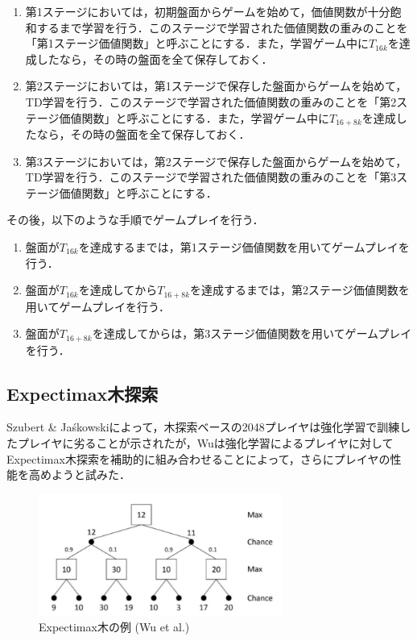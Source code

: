 \documentclass{suribt}
\begin{document}
\begin{enumerate}
\item 第1ステージにおいては，初期盤面からゲームを始めて，価値関数が十分飽和するまで学習を行う．このステージで学習された価値関数の重みのことを「第1ステージ価値関数」と呼ぶことにする．また，学習ゲーム中に$T_{16k}$を達成したなら，その時の盤面を全て保存しておく．
\item 第2ステージにおいては，第1ステージで保存した盤面からゲームを始めて，TD学習を行う．このステージで学習された価値関数の重みのことを「第2ステージ価値関数」と呼ぶことにする．また，学習ゲーム中に$T_{16+8k}$を達成したなら，その時の盤面を全て保存しておく．
\item 第3ステージにおいては，第2ステージで保存した盤面からゲームを始めて，TD学習を行う．このステージで学習された価値関数の重みのことを「第3ステージ価値関数」と呼ぶことにする．
\end{enumerate}

その後，以下のような手順でゲームプレイを行う．

\begin{enumerate}
\item 盤面が$T_{16k}$を達成するまでは，第1ステージ価値関数を用いてゲームプレイを行う．
\item 盤面が$T_{16k}$を達成してから$T_{16+8k}$を達成するまでは，第2ステージ価値関数を用いてゲームプレイを行う．
\item 盤面が$T_{16+8k}$を達成してからは，第3ステージ価値関数を用いてゲームプレイを行う．
\end{enumerate}

\subsection{Expectimax木探索}
Szubert \& Ja\'{s}kowskiによって，木探索ベースの2048プレイヤは強化学習で訓練したプレイヤに劣ることが示されたが，Wuは強化学習によるプレイヤに対してExpectimax木探索を補助的に組み合わせることによって，さらにプレイヤの性能を高めようと試みた．

\begin{figure}[t]
	\begin{center}
	\includegraphics[width=8cm]{figure_003.png}
	\caption{Expectimax木の例 (Wu et al.)}
	\label{figure_003}
	\end{center}
\end{figure}
\end{document}
